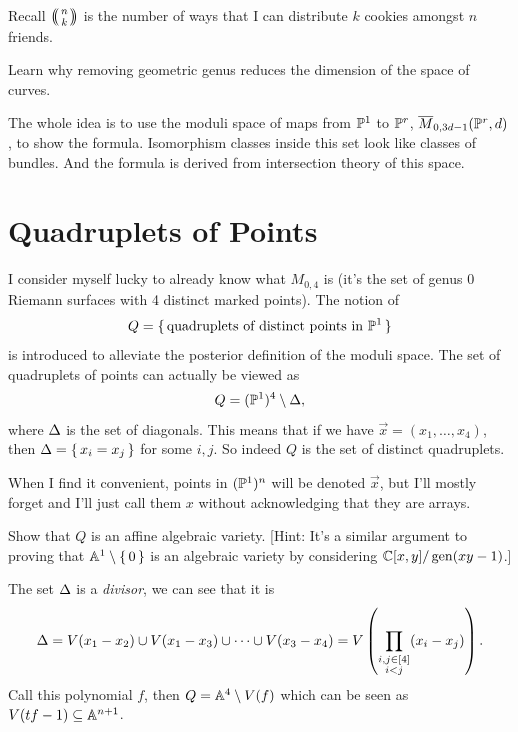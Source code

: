 \documentclass[12pt]{memoir}
\begin{document}
\begin{Rmk}
    Recall $\multinom{n}{k}$ is the number of ways that I can distribute $k$ cookies amongst $n$ friends.
\end{Rmk}

\begin{Ej}
Learn why removing geometric genus reduces the dimension of the space of curves.
\end{Ej}

\begin{ptcb}
\end{ptcb}

The whole idea is to use the moduli space of maps from $\mathbb{P}^1$ to $\mathbb{P}^r$, $\overline M_{0,3d-1}(\mathbb{P}^r,d)$, to show the formula. Isomorphism classes inside this set look like classes of bundles. And the formula is derived from intersection theory of this space. 

\section{Quadruplets of Points}

I consider myself lucky to already know what $M_{0,4}$ is (it's the set of genus 0 Riemann surfaces with 4 distinct marked points). The notion of 
$$Q=\{\,\text{quadruplets of distinct points in }\mathbb{P}^1\,\}$$
is introduced to alleviate the posterior definition of the moduli space. The set of quadruplets of points can actually be viewed as 
$$Q=(\mathbb{P}^1)^4\setminus\Delta,$$
where $\Delta$ is the set of diagonals. This means that if we have $\vec x=(x_1,\dots,x_4)$, then $\Delta=\{\,x_i=x_j\,\}$ for some $i,j$. So indeed $Q$ is the set of distinct quadruplets. 

\begin{Rmk}
    When I find it convenient, points in $(\mathbb{P}^1)^n$ will be denoted $\vec x$, but I'll mostly forget and I'll just call them $x$ without acknowledging that they are arrays.
\end{Rmk}

\begin{Ej}
Show that $Q$ is an affine algebraic variety. [Hint: It's a similar argument to proving that $\mathbb{A}^1\setminus\{\,0\,\}$ is an algebraic variety by considering $\mathbb{C}[x,y]/\operatorname{gen}(xy-1)$.]
\end{Ej}

\begin{ptcb}
    The set $\Delta$ is a \emph{divisor}, we can see that it is 
    $$\Delta=V(x_1-x_2)\cup V(x_1-x_3)\cup\cdots\cup V(x_3-x_4)=V\left(\prod_{\substack{i,j\in\left\lbrack4\right\rbrack\\ i<j}}(x_i-x_j)\right).$$
    Call this polynomial $f$, then $Q=\mathbb{A}^4\setminus V(f)$ which can be seen as $V(tf-1)\subseteq \mathbb{A}^{n+1}$.
    \end{ptcb}
\end{document}
